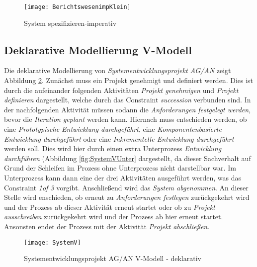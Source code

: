 \begin{figure}[!htbp]
\begin{center}
  \texttt{[image: BerichtswesenimpKlein]} %
  \caption{System spezifizieren-imperativ}
  \label{fig:BerichtswesenimpKlein}
\end{center}
\end{figure}

\clearpage
\subsection{Deklarative Modellierung V-Modell}


Die deklarative Modellierung von \textit{Systementwicklungsprojekt AG/AN}  zeigt Abbildung \ref{fig:SystemV}. \newline
Zunächst muss ein Projekt genehmigt und definiert werden. Dies ist durch die aufeinander folgenden Aktivitäten \textit{Projekt genehmigen} und \textit{Projekt definieren} dargestellt, welche durch das Constraint \textit{succession} verbunden sind.\newline
In der nachfolgenden Aktivität müssen sodann die \textit{Anforderungen festgelegt werden}, bevor die \textit{Iteration geplant} werden kann. \newline
Hiernach muss entschieden werden, ob eine \textit{Prototypische Entwicklung durchgeführt}, eine \textit{Komponentenbasierte Entwicklung durchgeführt} oder eine \textit{Inkrementelle Entwicklung durchgeführt} werden soll. Dies wird hier durch einen extra Unterprozess \textit{Entwicklung durchführen} (Abbildung \ref{fig:SystemVUnter} dargestellt, da dieser Sachverhalt auf Grund der Schleifen im Prozess ohne Unterprozess nicht darstellbar war. Im Unterprozess kann dann eine der drei Aktivitäten ausgeführt werden, was das Constraint \textit{1of 3} vorgibt.\newline
Anschließend wird das \textit{System abgenommen}.\newline
An dieser Stelle wird enschieden, ob erneut zu \textit{Anforderungen festlegen} zurückgekehrt wird und der Prozess ab dieser Aktivität erneut startet oder ob zu \textit{Projekt ausschreiben} zurückgekehrt wird und der Prozess ab hier erneut startet. Ansonsten endet der Prozess mit der Aktivität \textit{Projekt abschließen}.

\begin{figure}[!htbp]
\begin{center}
  \texttt{[image: SystemV]} %
  \caption{Systementwicklungsprojekt AG/AN  V-Modell - deklarativ}
  \label{fig:SystemV}
\end{center}
\end{figure}

